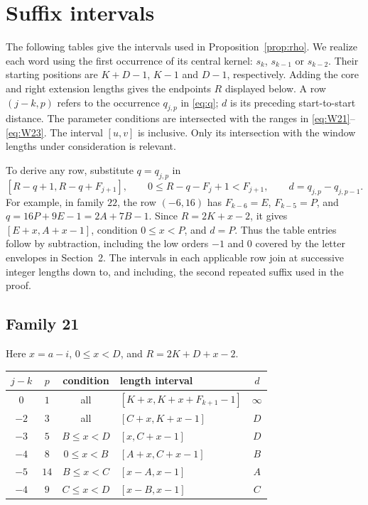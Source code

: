 \documentclass[11pt]{amsart}
\begin{document}
\appendix
\section{Suffix intervals}\label{app:intervals}
The following tables give the intervals used in Proposition~\ref{prop:rho}.
We realize each word using the first occurrence of its central kernel:
$s_k$, $s_{k-1}$ or $s_{k-2}$.  Their starting positions are
$K+D-1$, $K-1$ and $D-1$, respectively.  Adding the core and right
extension lengths gives the endpoints $R$ displayed below.
A row $(j-k,p)$ refers to the occurrence $q_{j,p}$ in \eqref{eq:q};
$d$ is its preceding start-to-start distance.  The parameter conditions
are intersected with the ranges in \eqref{eq:W21}--\eqref{eq:W23}.
The interval $[u,v]$ is inclusive.  Only its intersection with the window
lengths under consideration is relevant.

To derive any row, substitute $q=q_{j,p}$ in
\[
 [R-q+1,R-q+F_{j+1}],\qquad
 0\le R-q-F_j+1<F_{j+1},\qquad d=q_{j,p}-q_{j,p-1}.
\]
For example, in family $22$, the row $(-6,16)$ has
$F_{k-6}=E$, $F_{k-5}=P$, and $q=16P+9E-1=2A+7B-1$.
Since $R=2K+x-2$, it gives $[E+x,A+x-1]$, condition $0\le x<P$,
and $d=P$.  Thus the table entries follow by subtraction, including
the low orders $-1$ and $0$ covered by the letter envelopes in Section~2.
The intervals in each applicable row join at successive integer lengths
down to, and including, the second repeated suffix used in the proof.

\subsection*{Family 21}
Here $x=a-i$, $0\le x<D$, and $R=2K+D+x-2$.
\begin{center}\small
\begin{tabular}{ccclc}
\toprule
$j-k$&$p$&condition&length interval&$d$\\\midrule
$0$&$1$&all&$[K+x,K+x+F_{k+1}-1]$&$\infty$\\
$-2$&$3$&all&$[C+x,K+x-1]$&$D$\\
$-3$&$5$&$B\le x<D$&$[x,C+x-1]$&$D$\\
$-4$&$8$&$0\le x<B$&$[A+x,C+x-1]$&$B$\\
$-5$&$14$&$B\le x<C$&$[x-A,x-1]$&$A$\\
$-4$&$9$&$C\le x<D$&$[x-B,x-1]$&$C$\\
\bottomrule
\end{tabular}\end{center}
\end{document}
